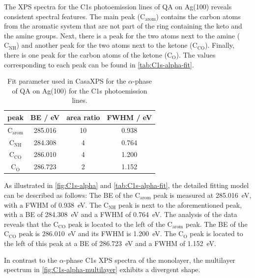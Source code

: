 The \ac{XPS} spectra for the C1s photoemission lines of \ac{QA} on Ag(100) reveals consistent spectral features. The main peak ($\mathrm{C_{arom}}$) contains the carbon atoms from the aromatic system that are not part of the ring containing the keto and the amine groups. Next, there is a peak for the two atoms next to the amine ($\mathrm{C_{NH}}$) and another peak for the two atoms next to the ketone ($\mathrm{C_{CO}}$). Finally, there is one peak for the carbon atoms of the ketone ($\mathrm{C_{O}}$). The values corresponding to each peak can be found in \autoref{tab:C1s-alpha-fit}.

\begin{table}[H]
	\centering
	\caption{Fit parameter used in CasaXPS\autocite{CasaSoftwareLtd2022} for the $\alpha$-phase of \ac{QA} on Ag(100) for the C1s photoemission lines.}
	\begin{tabular}{|c|c|c|c|}
		\hline
		peak & \ac{BE} / eV & area ratio & FWHM / eV \\
		\hline
		$\mathrm{C_{arom}}$ & 285.016 & 10 & 0.938 \\ \hline
		$\mathrm{C_{NH}}$ & 284.308 & 4 & 0.764 \\ \hline
		$\mathrm{C_{CO}}$ & 286.010 & 4 & 1.200 \\ \hline
		$\mathrm{C_{O}}$ & 286.723 & 2 & 1.152 \\ \hline
	\end{tabular}
	\label{tab:C1s-alpha-fit}
\end{table}

As illustrated in \autoref{fig:C1s-alpha} and \autoref{tab:C1s-alpha-fit}, the detailed fitting model can be described as follows:
The \ac{BE} of the $\mathrm{C_{arom}}$ peak is measured at 285.016~\si{\eV}, with a \ac{FWHM} of 0.938~\si{\eV}. The $\mathrm{C_{NH}}$ peak is next to the aforementioned peak, with a \ac{BE} of 284.308~\si{\eV} and a \ac{FWHM} of 0.764~\si{\eV}. The analysis of the data reveals that the $\mathrm{C_{CO}}$ peak is located to the left of the $\mathrm{C_{arom}}$ peak. The \ac{BE} of the $\mathrm{C_{CO}}$ peak is 286.010~\si{\eV} and its \ac{FWHM} is 1.200~\si{\eV}. The $\mathrm{C_{O}}$ peak is located to the left of this peak at a \ac{BE} of 286.723~\si{\eV} and a \ac{FWHM} of 1.152~\si{\eV}.

In contrast to the $\alpha$-phase C1s \ac{XPS} spectra of the monolayer, the multilayer spectrum in \autoref{fig:C1s-alpha-multilayer} exhibits a divergent shape.


